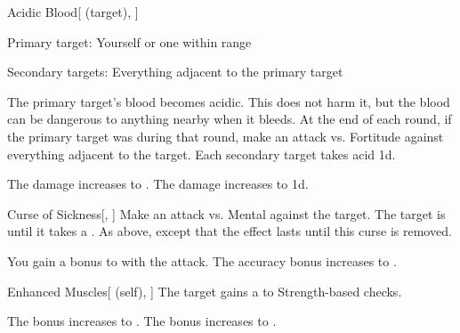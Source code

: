 \lowercase{\hypertarget{spell:Acidic Blood}{}}\label{spell:Acidic Blood}
\begin{attuneability}[Rank 3]{\hypertarget{spell:Acidic Blood}{Acidic Blood}}[ (target), ]

Primary target: Yourself or one  within \rngmed range
\par\noindent
Secondary targets: Everything adjacent to the primary target

The primary target's blood becomes acidic.
This does not harm it, but the blood can be dangerous to anything nearby when it bleeds.
At the end of each round, if the primary target was  during that round, make an attack vs. Fortitude against everything adjacent to the target.
\hit Each secondary target takes acid  \minus1d.

\rankline
{} The damage increases to .
 The damage increases to  \plus1d.
\end{attuneability}
\vspace{0.25em}



\lowercase{\hypertarget{spell:Curse of Sickness}{}}\label{spell:Curse of Sickness}
\begin{freeability}[Rank 3]{\hypertarget{spell:Curse of Sickness}{Curse of Sickness}}[, ]
Make an attack vs. Mental against the target.
\hit The target is  until it takes a .
\crit As above, except that the effect lasts until this curse is removed.

\rankline
{} You gain a  bonus to  with the attack.
 The accuracy bonus increases to .
\end{freeability}
\vspace{0.25em}



\lowercase{\hypertarget{spell:Enhanced Muscles}{}}\label{spell:Enhanced Muscles}
\begin{attuneability}[Rank 3]{\hypertarget{spell:Enhanced Muscles}{Enhanced Muscles}}[ (self), ]
The target gains a   to Strength-based checks.

\rankline
{} The bonus increases to .
 The bonus increases to .
\end{attuneability}
\vspace{0.25em}



